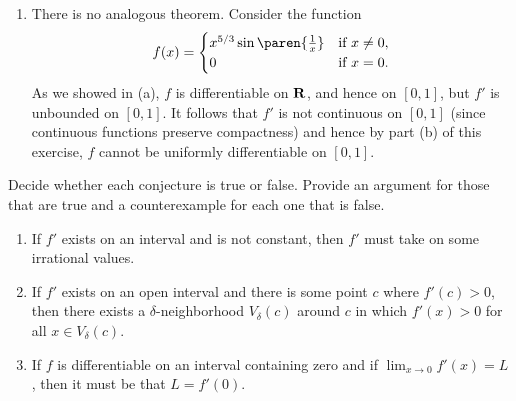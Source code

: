 \documentclass{lew98_solutions}
\begin{document}
\begin{solution}
\begin{enumerate}
        \item There is no analogous theorem. Consider the function
        \[
            f(x) = \begin{cases}
                x^{5/3} \sin \paren{\tfrac{1}{x}} & \text{if } x \neq 0, \\
                0 & \text{if } x = 0.
            \end{cases}
        \]
        As we showed in  (a), \( f \) is differentiable on \( \mathbf{R} \), and hence on \( [0, 1] \), but \( f' \) is unbounded on \( [0, 1] \). It follows that \( f' \) is not continuous on \( [0, 1] \) (since continuous functions preserve compactness) and hence by part (b) of this exercise, \( f \) cannot be uniformly differentiable on \( [0, 1] \).
    \end{enumerate}
\end{solution}

\begin{exercise}
\label{ex:5.2.9}
    Decide whether each conjecture is true or false. Provide an argument for those that are true and a counterexample for each one that is false.
    \begin{enumerate}
        \item If \( f' \) exists on an interval and is not constant, then \( f' \) must take on some irrational values.

        \item If \( f' \) exists on an open interval and there is some point \( c \) where \( f'(c) > 0 \), then there exists a \( \delta \)-neighborhood \( V_{\delta}(c) \) around \( c \) in which \( f'(x) > 0 \) for all \( x \in V_{\delta}(c) \).

        \item If \( f \) is differentiable on an interval containing zero and if \( \lim_{x \to 0} f'(x) = L \), then it must be that \( L = f'(0) \).
    \end{enumerate}
\end{exercise}
\end{document}
